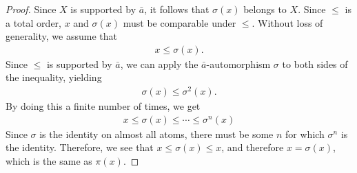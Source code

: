 {\begin{proof}
Since $X$ is supported by $\bar a$, it follows that $\sigma(x)$ belongs to $X$. Since $\le$ is a total order, $x$ and $\sigma(x)$ must be comparable under $\le$. Without loss of generality, we assume that 
\begin{align*}
	x \le \sigma(x).
\end{align*}
 Since $\le$ is supported by $\bar a$, we can apply the $\bar a$-automorphism $\sigma$ to both sides of the inequality, yielding
\begin{align*}
	\sigma(x) \le \sigma^2(x).
\end{align*}
By doing this a finite number of times, we get
\begin{align*}
	x \le \sigma(x) \le \cdots \le \sigma^n(x) 
\end{align*}
Since $\sigma$ is the identity on almost all atoms, there must be some $n$ for which $\sigma^n$ is the identity. Therefore, we see that $x \le \sigma(x) \le x$, and therefore $x=\sigma(x)$, which is the same as $\pi(x)$.
\end{proof}}



